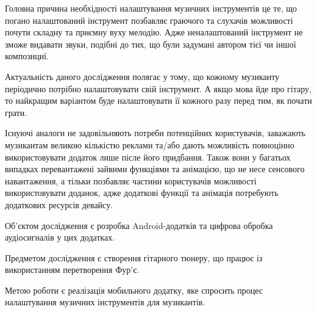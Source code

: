 
Головна причина необхідності налаштування музичних інструментів це те, що погано налаштований інструмент позбавляє граючого та слухачів можливості почути складну та приємну вуху мелодію. Адже неналаштований інструмент не зможе видавати звуки, подібні до тих, що були задумані автором тієї чи іншої композициї.

Актуальність даного дослідження полягає у тому, що кожному музиканту періодично потрібно налаштовувати свій інструмент. А якщо мова йде про гітару, то найкращим варіантом буде налаштовувати її кожного разу перед тим, як почати грати.

Існуючі аналоги не задовільняють потреби потенційних користувачів, заважають музикантам великою кількістю реклами та/або дають можливість повноцінно використовувати додаток лише післе його придбання. Також вони у багатьох випадках перевантажені зайвими функціями та анімацією, що не несе сенсового навантаження, а тільки позбавляє частини користувачів можливості використовувати доданок, адже додаткові функції та анімація потребують додаткових ресурсів девайсу.

Об'єктом дослідження є розробка Android-додатків та цифрова обробка аудіосигналів у цих додатках.

Предметом дослідження є створення гітарного тюнеру, що працює із використанням перетворення Фур'є.

Метою роботи є реалізація мобильного додатку, яке спросить процес налаштування музичних інструментів для музикантів.


